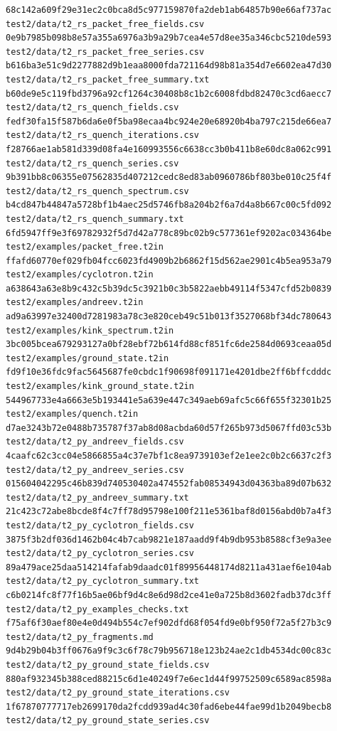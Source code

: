 \documentclass[
  10pt,
]{article}
\begin{document}
\begin{verbatim}
68c142a609f29e31ec2c0bca8d5c977159870fa2deb1ab64857b90e66af737ac  test2/data/t2_rs_packet_free_fields.csv
0e9b7985b098b8e57a355a6976a3b9a29b7cea4e57d8ee35a346cbc5210de593  test2/data/t2_rs_packet_free_series.csv
b616ba3e51c9d2277882d9b1eaa8000fda721164d98b81a354d7e6602ea47d30  test2/data/t2_rs_packet_free_summary.txt
b60de9e5c119fbd3796a92cf1264c30408b8c1b2c6008fdbd82470c3cd6aecc7  test2/data/t2_rs_quench_fields.csv
fedf30fa15f587b6da6e0f5ba98ecaa4bc924e20e68920b4ba797c215de66ea7  test2/data/t2_rs_quench_iterations.csv
f28766ae1ab581d339d08fa4e160993556c6638cc3b0b411b8e60dc8a062c991  test2/data/t2_rs_quench_series.csv
9b391bb8c06355e07562835d407212cedc8ed83ab0960786bf803be010c25f4f  test2/data/t2_rs_quench_spectrum.csv
b4cd847b44847a5728bf1b4aec25d5746fb8a204b2f6a7d4a8b667c00c5fd092  test2/data/t2_rs_quench_summary.txt
6fd5947ff9e3f69782932f5d7d42a778c89bc02b9c577361ef9202ac034364be  test2/examples/packet_free.t2in
ffafd60770ef029fb04fcc6023fd4909b2b6862f15d562ae2901c4b5ea953a79  test2/examples/cyclotron.t2in
a638643a63e8b9c432c5b39dc5c3921b0c3b5822aebb49114f5347cfd52b0839  test2/examples/andreev.t2in
ad9a63997e32400d7281983a78c3e820ceb49c51b013f3527068bf34dc780643  test2/examples/kink_spectrum.t2in
3bc005bcea679293127a0bf28ebf72b614fd88cf851fc6de2584d0693ceaa05d  test2/examples/ground_state.t2in
fd9f10e36fdc9fac5645687fe0cbdc1f90698f091171e4201dbe2ff6bffcdddc  test2/examples/kink_ground_state.t2in
544967733e4a6663e5b193441e5a639e447c349aeb69afc5c66f655f32301b25  test2/examples/quench.t2in
d7ae3243b72e0488b735787f37ab8d08acbda60d57f265b973d5067ffd03c53b  test2/data/t2_py_andreev_fields.csv
4caafc62c3cc04e5866855a4c37e7bf1c8ea9739103ef2e1ee2c0b2c6637c2f3  test2/data/t2_py_andreev_series.csv
015604042295c46b839d740530402a474552fab08534943d04363ba89d07b632  test2/data/t2_py_andreev_summary.txt
21c423c72abe8bcde8f4c7ff78d95798e100f211e5361baf8d0156abd0b7a4f3  test2/data/t2_py_cyclotron_fields.csv
3875f3b2df036d1462b04c4b7cab9821e187aadd9f4b9db953b8588cf3e9a3ee  test2/data/t2_py_cyclotron_series.csv
89a479ace25daa514214fafab9daadc01f89956448174d8211a431aef6e104ab  test2/data/t2_py_cyclotron_summary.txt
c6b0214fc8f77f16b5ae06bf9d4c8e6d98d2ce41e0a725b8d3602fadb37dc3ff  test2/data/t2_py_examples_checks.txt
f75af6f30aef80e4e0d494b554c7ef902dfd68f054fd9e0bf950f72a5f27b3c9  test2/data/t2_py_fragments.md
9d4b29b04b3ff0676a9f9c3c6f78c79b956718e123b24ae2c1db4534dc00c83c  test2/data/t2_py_ground_state_fields.csv
880af932345b388ced88215c6d1e40249f7e6ec1d44f99752509c6589ac8598a  test2/data/t2_py_ground_state_iterations.csv
1f67870777717eb2699170da2fcdd939ad4c30fad6ebe44fae99d1b2049becb8  test2/data/t2_py_ground_state_series.csv

\end{verbatim}
\end{document}
